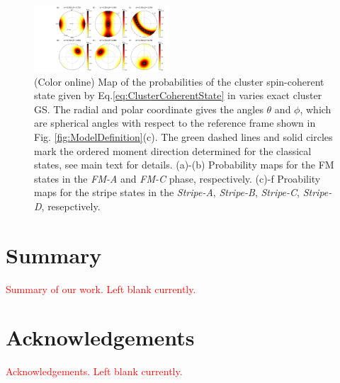 \documentclass[aps,prb,reprint,amsfonts,amsmath,amssymb,showpacs,groupedaddress,superscriptaddress]{revtex4-1}
\begin{document}
\begin{figure}
    \includegraphics[width=0.45\textwidth]{Fig4.pdf}
    \caption{(Color online) Map of the probabilities of the cluster spin-coherent state given by Eq.\eqref{eq:ClusterCoherentState} in varies exact cluster GS. The radial and polar coordinate gives the angles $\theta$ and $\phi$, which are spherical angles with respect to the reference frame shown in Fig. \ref{fig:ModelDefinition}(c). The green dashed lines and solid circles mark the ordered moment direction determined for the classical states, see main text for details. (a)-(b) Probability maps for the FM states in the \emph{FM-A} and \emph{FM-C} phase, respectively. (c)-{f} Proability maps for the stripe states in the \emph{Stripe-A}, \emph{Stripe-B}, \emph{Stripe-C}, \emph{Stripe-D}, resepctively.}
     \label{fig:Proabilities}
\end{figure}



\section{Summary}
\textcolor{red}{Summary of our work. Left blank currently.}

\section{Acknowledgements}
\textcolor{red}{Acknowledgements. Left blank currently.}


\end{document}
